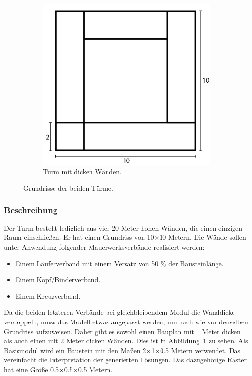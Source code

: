 \begin{figure}[ht!]
\begin{subfigure}[b]{0.35\columnwidth}
    \includegraphics[width=\columnwidth]{fig/scenario1_story_plan_thick.png}
    \caption{Turm mit dicken Wänden.}
  \end{subfigure}
  \hspace*{\fill}%
  \caption{Grundrisse der beiden Türme.}\label{fig:scenarios:Scenario1 Gebaeudeplan}
\end{figure}


\subsubsection*{Beschreibung}
Der Turm besteht lediglich aus vier 20 Meter hohen Wänden, die einen einzigen Raum einschließen.
Er hat einen Grundriss von 10$\times$10 Metern.
Die Wände sollen unter Anwendung folgender Mauerwerksverbände realisiert werden:
\begin{itemize}
  \item Einem Läuferverband mit einem Versatz von 50 \% der Bausteinlänge.
  \item Einem Kopf/Binderverband.
  \item Einem Kreuzverband.
\end{itemize}
Da die beiden letzteren Verbände bei gleichbleibendem Modul die Wanddicke verdoppeln, muss das Modell etwas angepasst werden, um nach wie vor denselben Grundriss aufzuweisen.
Daher gibt es sowohl einen Bauplan mit 1 Meter dicken als auch einen mit 2 Meter dicken Wänden.
Dies ist in Abbildung~\ref{fig:scenarios:Scenario1 Gebaeudeplan} zu sehen.
Als Basismodul wird ein Baustein mit den Maßen 2$\times$1$\times$0.5 Metern verwendet.
Das vereinfacht die Interpretation der generierten Lösungen.
Das dazugehörige Raster hat eine Größe 0.5$\times$0.5$\times$0.5 Metern.

